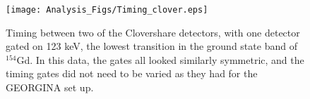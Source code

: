\begin{figure}
    \centering
    \texttt{[image: Analysis\_Figs/Timing\_clover.eps]}
    \caption{Timing between two of the Clovershare detectors, with one detector gated on 123 keV, the lowest transition in the ground state band of $^{154}$Gd. In this data, the gates all looked similarly symmetric, and the timing gates did not need to be varied as they had for the GEORGINA set up.}
    \label{fig:timing_clover}
\end{figure}